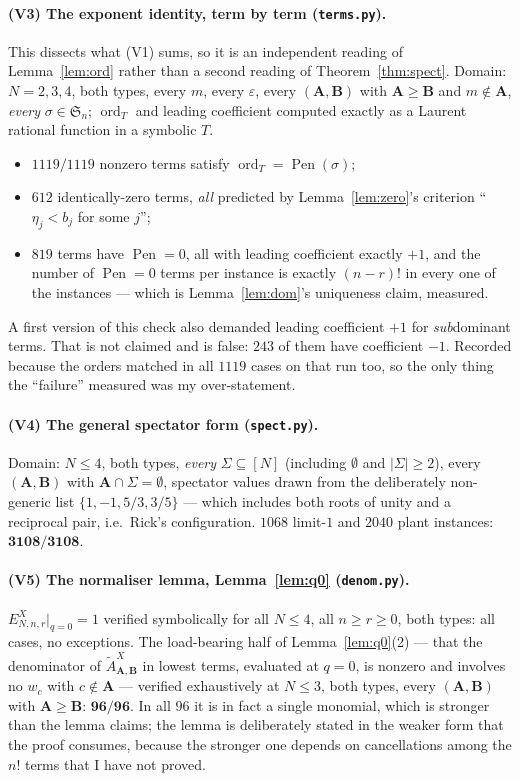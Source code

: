 \documentclass[11pt]{article}
\theoremstyle{plain}
\theoremstyle{definition}
\newcommand{\At}{\widetilde{A}}
\newcommand{\bA}{\mathbf{A}}
\newcommand{\bB}{\mathbf{B}}
\newcommand{\ord}{\operatorname{ord}}
\newcommand{\Pen}{\operatorname{Pen}}
\begin{document}
\paragraph{(V3) The exponent identity, term by term (\texttt{terms.py}).}
This dissects what (V1) sums, so it is an independent reading of
Lemma~\ref{lem:ord} rather than a second reading of Theorem~\ref{thm:spect}.
Domain: $N=2,3,4$, both types, every $m$, every $\varepsilon$, every
$(\bA,\bB)$ with $\bA\ge\bB$ and $m\notin\bA$, \emph{every} $\sigma\in
\mathfrak{S}_n$; $\ord_T$ and leading coefficient computed exactly as a Laurent
rational function in a symbolic $T$.
\begin{itemize}[leftmargin=1.4em]
\item $1119/1119$ nonzero terms satisfy $\ord_T=\Pen(\sigma)$;
\item $612$ identically-zero terms, \emph{all} predicted by
  Lemma~\ref{lem:zero}'s criterion ``$\eta_j<b_j$ for some $j$'';
\item $819$ terms have $\Pen=0$, all with leading coefficient exactly $+1$, and
  the number of $\Pen=0$ terms per instance is exactly $(n-r)!$ in every one of
  the instances --- which is Lemma~\ref{lem:dom}'s uniqueness claim, measured.
\end{itemize}
A first version of this check also demanded leading coefficient $+1$ for
\emph{sub}dominant terms.  That is not claimed and is false: $243$ of them have
coefficient $-1$.  Recorded because the orders matched in all $1119$ cases on that
run too, so the only thing the ``failure'' measured was my over-statement.

\paragraph{(V4) The general spectator form (\texttt{spect.py}).}
Domain: $N\le4$, both types, \emph{every} $\Sigma\subseteq[N]$ (including
$\emptyset$ and $|\Sigma|\ge2$), every $(\bA,\bB)$ with $\bA\cap\Sigma=\emptyset$,
spectator values drawn from the deliberately non-generic list
$\{1,-1,5/3,3/5\}$ --- which includes both roots of unity and a reciprocal pair,
i.e.\ Rick's configuration.  $1068$ limit-$1$ and $2040$ plant instances:
$\mathbf{3108/3108}$.

\paragraph{(V5) The normaliser lemma, Lemma~\ref{lem:q0} (\texttt{denom.py}).}
$E^{X}_{N,n,r}|_{q=0}=1$ verified symbolically for all $N\le4$, all $n\ge r\ge0$,
both types: all cases, no exceptions.  The load-bearing half of
Lemma~\ref{lem:q0}(2) --- that the denominator of $\At^{X}_{\bA,\bB}$ in lowest
terms, evaluated at $q=0$, is nonzero and involves no $w_c$ with $c\notin\bA$ ---
verified exhaustively at $N\le3$, both types, every $(\bA,\bB)$ with
$\bA\ge\bB$: $\mathbf{96/96}$.  In all $96$ it is in fact a single monomial,
which is stronger than the lemma claims; the lemma is deliberately stated in the
weaker form that the proof consumes, because the stronger one depends on
cancellations among the $n!$ terms that I have not proved.
\end{document}

